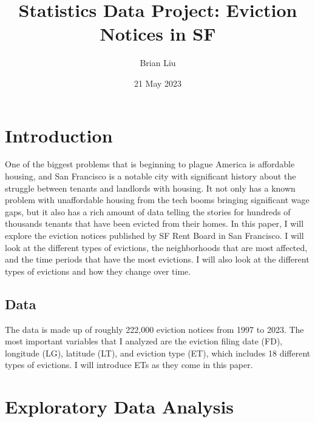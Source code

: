 \documentclass{article}\usepackage[]{graphicx}\usepackage[]{xcolor}
\title{Statistics Data Project: Eviction Notices in SF}
\author{Brian Liu}
\date{21 May 2023}
\begin{document}
\maketitle

\section{Introduction}
One of the biggest problems that is beginning to plague America is affordable housing, and San Francisco is a notable city with significant history about the struggle between tenants and landlords with housing. It not only has a known problem with unaffordable housing from the tech booms bringing significant wage gaps, but it also has a rich amount of data telling the stories for hundreds of thousands tenants that have been evicted from their homes. In this paper, I will explore the eviction notices published by SF Rent Board in San Francisco. I will look at the different types of evictions, the neighborhoods that are most affected, and the time periods that have the most evictions. I will also look at the different types of evictions and how they change over time.

\subsection{Data}
The data is made up of roughly 222,000 eviction notices from 1997 to 2023. The most important variables that I analyzed are the eviction filing date (FD), longitude (LG), latitude (LT), and eviction type (ET), which includes 18 different types of evictions. I will introduce ETs as they come in this paper.

\section{Exploratory Data Analysis}
\end{document}
